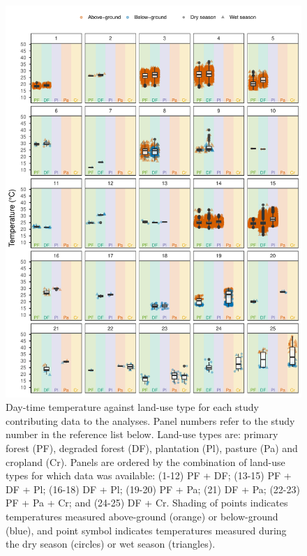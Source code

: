 \documentclass[12pt,a4paper,]{report}
\theoremstyle{definition}
\theoremstyle{definition}
\theoremstyle{definition}
\theoremstyle{remark}
\begin{document}
\begin{figure}
\centering
\includegraphics{./figures/fig-A-1-1-1.pdf}
\caption{\label{fig:fig-A-1-1}Day-time temperature against land-use type for
each study contributing data to the analyses. Panel numbers refer to the
study number in the reference list below. Land-use types are: primary
forest (PF), degraded forest (DF), plantation (Pl), pasture (Pa) and
cropland (Cr). Panels are ordered by the combination of land-use types
for which data was available: (1-12) PF + DF; (13-15) PF + DF + Pl;
(16-18) DF + Pl; (19-20) PF + Pa; (21) DF + Pa; (22-23) PF + Pa + Cr;
and (24-25) DF + Cr. Shading of points indicates temperatures measured
above-ground (orange) or below-ground (blue), and point symbol indicates
temperatures measured during the dry season (circles) or wet season
(triangles).}
\end{figure}
\end{document}
